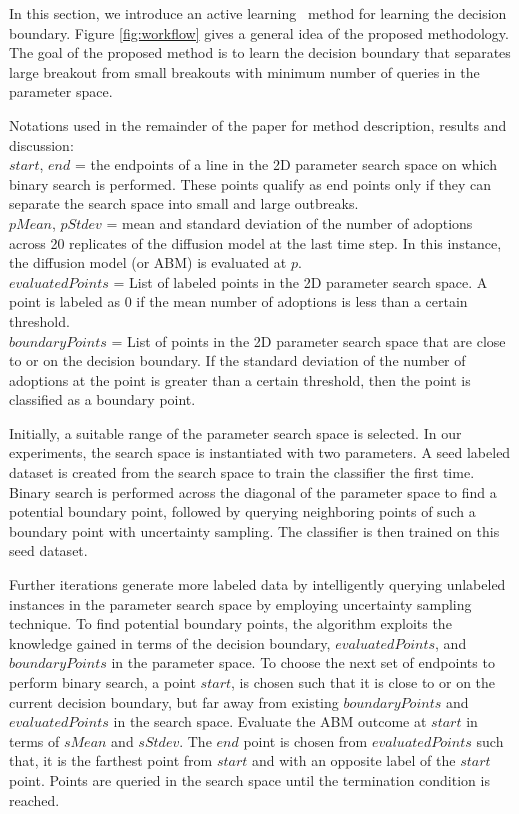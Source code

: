 In this section, we introduce an active learning~\cite{sung95active} method for learning the decision boundary. 
Figure \ref{fig:workflow} gives a general idea of the proposed methodology. The goal of the proposed method is
to learn the decision boundary that separates large breakout from small breakouts with minimum number of queries in the parameter space.

Notations used in the remainder of the paper for method description, results and discussion:\\
$start$, $end$ = the endpoints of a line in the 2D parameter search space on which binary search is performed. These points qualify as end points only if they can separate the search space into small and large outbreaks. \\
\noindent
$pMean$, $pStdev$ = mean and standard deviation of the number of adoptions across 20 replicates of the diffusion model at the last time step. In this instance, the diffusion model (or ABM) is evaluated at $p$.\\
\noindent
$evaluatedPoints$ = List of labeled points in the 2D parameter search space. A point is labeled as 0 if the mean number of adoptions is less than a certain threshold.\\
\noindent
$boundaryPoints$ = List of points in the 2D parameter search space that are close to or on the decision boundary. If the standard deviation of the number of adoptions at the point is greater than a certain threshold, then the point is classified as a boundary point.

Initially, a suitable range of the parameter search space is selected. In our experiments, the search space is instantiated with two parameters. 
A seed labeled dataset is created from the search space to train the classifier the first time. 
Binary search is performed across the diagonal of the parameter space to find a potential boundary point, followed by querying neighboring points of such a boundary point with uncertainty sampling.
The classifier is then trained on this seed dataset.

Further iterations generate more labeled data by intelligently querying unlabeled instances in the parameter search space by employing uncertainty sampling technique.
To find potential boundary points, the algorithm exploits the knowledge gained in terms of the decision boundary, $evaluatedPoints$, and $boundaryPoints$ in the parameter space. To choose the next set of endpoints to perform binary search, a point $start$, is chosen such that it is close to or on the current decision boundary, but far away from existing $boundaryPoints$ and $evaluatedPoints$ in the search space. 
Evaluate the ABM outcome at $start$ in terms of $sMean$ and $sStdev$. The $end$ point is chosen from $evaluatedPoints$ such that, it is the farthest point from $start$ and with an opposite label of the $start$ point. Points are queried in the search space until the termination condition is reached.

